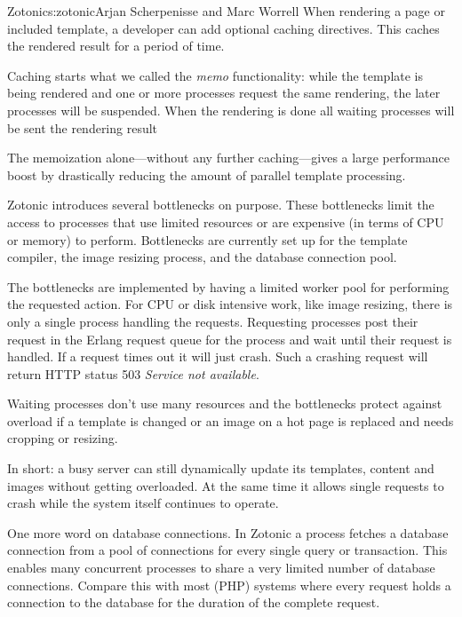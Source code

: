 \begin{aosachapter}{Zotonic}{s:zotonic}{Arjan Scherpenisse and Marc Worrell}
When rendering a page or included template, a developer can add optional
caching directives. This caches the rendered result for a period of
time.

Caching starts what we called the \emph{memo} functionality: while the
template is being rendered and one or more processes request the same
rendering, the later processes will be suspended. When the rendering is
done all waiting processes will be sent the rendering result

The memoization alone---without any further caching---gives a large
performance boost by drastically reducing the amount of parallel
template processing.


Zotonic introduces several bottlenecks on purpose. These bottlenecks
limit the access to processes that use limited resources or are
expensive (in terms of CPU or memory) to perform. Bottlenecks are
currently set up for the template compiler, the image resizing process,
and the database connection pool.

The bottlenecks are implemented by having a limited worker pool for
performing the requested action. For CPU or disk intensive work, like
image resizing, there is only a single process handling the requests.
Requesting processes post their request in the Erlang request queue for
the process and wait until their request is handled. If a request times
out it will just crash. Such a crashing request will return HTTP status
503 \emph{Service not available}.

Waiting processes don't use many resources and the bottlenecks protect
against overload if a template is changed or an image on a hot page is
replaced and needs cropping or resizing.

In short: a busy server can still dynamically update its templates,
content and images without getting overloaded. At the same time it
allows single requests to crash while the system itself continues to
operate.


One more word on database connections. In Zotonic a process fetches a
database connection from a pool of connections for every single query or
transaction. This enables many concurrent processes to share a very
limited number of database connections. Compare this with most (PHP)
systems where every request holds a connection to the database for the
duration of the complete request.


\end{aosachapter}
